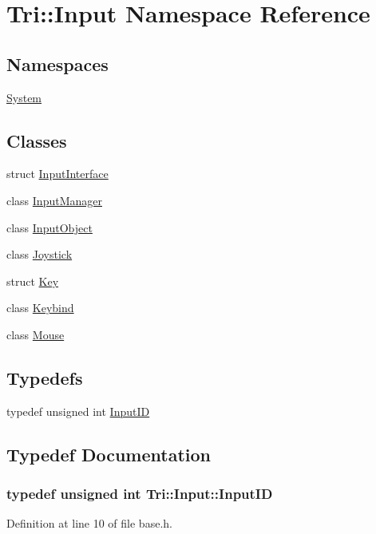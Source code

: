 \hypertarget{namespace_tri_1_1_input}{}\section{Tri\+:\+:Input Namespace Reference}
\label{namespace_tri_1_1_input}
\subsection*{Namespaces}
\begin{DoxyCompactItemize}
\item 
 \hyperlink{namespace_tri_1_1_input_1_1_system}{System}
\end{DoxyCompactItemize}
\subsection*{Classes}
\begin{DoxyCompactItemize}
\item 
struct \hyperlink{struct_tri_1_1_input_1_1_input_interface}{Input\+Interface}
\item 
class \hyperlink{class_tri_1_1_input_1_1_input_manager}{Input\+Manager}
\item 
class \hyperlink{class_tri_1_1_input_1_1_input_object}{Input\+Object}
\item 
class \hyperlink{class_tri_1_1_input_1_1_joystick}{Joystick}
\item 
struct \hyperlink{struct_tri_1_1_input_1_1_key}{Key}
\item 
class \hyperlink{class_tri_1_1_input_1_1_keybind}{Keybind}
\item 
class \hyperlink{class_tri_1_1_input_1_1_mouse}{Mouse}
\end{DoxyCompactItemize}
\subsection*{Typedefs}
\begin{DoxyCompactItemize}
\item 
typedef unsigned int \hyperlink{namespace_tri_1_1_input_ac94df02dceb9dbc5ca1512e9ded38154}{Input\+I\+D}
\end{DoxyCompactItemize}


\subsection{Typedef Documentation}
\hypertarget{namespace_tri_1_1_input_ac94df02dceb9dbc5ca1512e9ded38154}{}
\subsubsection[{Input\+I\+D}]{\setlength{\rightskip}{0pt plus 5cm}typedef unsigned int {\bf Tri\+::\+Input\+::\+Input\+I\+D}}\label{namespace_tri_1_1_input_ac94df02dceb9dbc5ca1512e9ded38154}


Definition at line 10 of file base.\+h.

